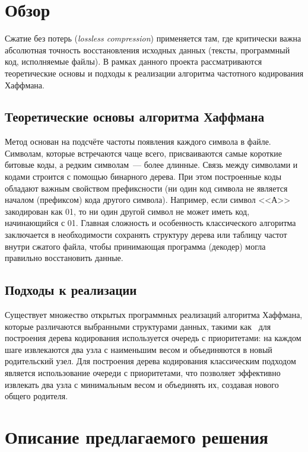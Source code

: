 \documentclass[a4paper]{article}
\begin{document}
\section{Обзор}

Сжатие без потерь (\textit{lossless compression}) применяется там, где критически важна абсолютная
точность восстановления исходных данных (тексты, программный код, исполняемые файлы). В
рамках данного проекта рассматриваются теоретические основы и подходы к реализации алгоритма
частотного кодирования Хаффмана.

\subsection{Теоретические основы алгоритма Хаффмана}

Метод основан на подсчёте частоты появления каждого символа в файле. Символам, которые
встречаются чаще всего, присваиваются самые короткие битовые коды, а редким символам~--- более
длинные. Связь между символами и кодами строится с помощью бинарного дерева. При этом
построенные коды обладают важным свойством префиксности (ни один код символа не является
началом (префиксом) кода другого символа). Например, если символ <<А>> закодирован как 01, то
ни один другой символ не может иметь код, начинающийся с 01. Главная сложность и особенность
классического алгоритма заключается в необходимости сохранять структуру дерева или таблицу
частот внутри сжатого файла, чтобы принимающая программа (декодер) могла правильно
восстановить данные.

\subsection{Подходы к реализации}

Существует множество открытых программных реализаций алгоритма Хаффмана, которые
различаются выбранными структурами данных, такими как~\cite{nayuki} для построения дерева
кодирования используется очередь с приоритетами: на каждом шаге извлекаются два узла с
наименьшим весом и объединяются в новый родительский узел. Для построения дерева кодирования
классическим подходом является использование очереди с приоритетами, что позволяет эффективно
извлекать два узла с минимальным весом и объединять их, создавая нового общего родителя.

\section{Описание предлагаемого решения}
\end{document}
